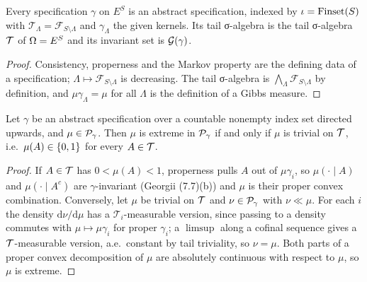 \begin{lemma}
    \label{lem:app-spec-toabstract}
    \leanok

    Every specification $\gamma$ on $E^S$ is an abstract specification, indexed by
    $\iota = \operatorname{Finset}(S)$ with $\mathcal{T}_\Lambda = \mathcal{F}_{S \setminus \Lambda}$ and
    $\gamma_\Lambda$ the given kernels.  Its tail σ-algebra is the tail σ-algebra $\mathcal{T}$ of
    $\Omega = E^S$ and its invariant set is $\mathcal{G}(\gamma)$.
\end{lemma}
\begin{proof}
    \leanok

    Consistency, properness and the Markov property are the defining data of a specification;
    $\Lambda \mapsto \mathcal{F}_{S\setminus\Lambda}$ is decreasing.  The tail σ-algebra is
    $\bigwedge_\Lambda \mathcal{F}_{S\setminus\Lambda}$ by definition, and
    $\mu \gamma_\Lambda = \mu$ for all $\Lambda$ is the definition of a Gibbs measure.
\end{proof}

\begin{theorem}
    \label{thm:app-extreme-iff-tail-trivial}
    \leanok

    Let $\gamma$ be an abstract specification over a countable nonempty index set directed
    upwards, and $\mu \in \mathcal{P}_\gamma$.  Then $\mu$ is extreme in $\mathcal{P}_\gamma$ if and only
    if $\mu$ is trivial on $\mathcal{T}$, i.e.\ $\mu(A) \in \left\{ 0,1 \right\}$ for every $A \in \mathcal{T}$.
\end{theorem}
\begin{proof}
    \leanok

    If $A \in \mathcal{T}$ has $0 < \mu(A) < 1$, properness pulls $A$ out of $\mu \gamma_i$, so
    $\mu(\cdot \mid A)$ and $\mu(\cdot \mid A^{c})$ are $\gamma$-invariant (Georgii (7.7)(b))
    and $\mu$ is their proper convex combination.  Conversely, let $\mu$ be trivial on $\mathcal{T}$
    and $\nu \in \mathcal{P}_\gamma$ with $\nu \ll \mu$.  For each $i$ the density
    $\mathrm{d}\nu/\mathrm{d}\mu$ has a $\mathcal{T}_i$-measurable version, since passing to a
    density commutes with $\mu \mapsto \mu\gamma_i$ for proper $\gamma_i$; a $\limsup$ along a
    cofinal sequence gives a $\mathcal{T}$-measurable version, a.e.\ constant by tail triviality, so
    $\nu = \mu$.  Both parts of a proper convex decomposition of $\mu$ are absolutely continuous
    with respect to $\mu$, so $\mu$ is extreme.
\end{proof}

